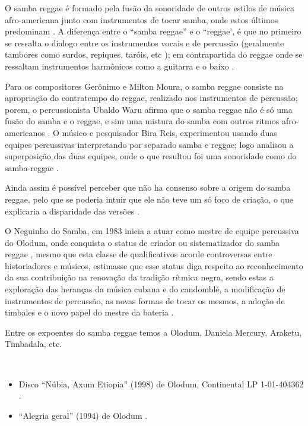 O samba reggae é formado pela fusão da sonoridade de outros estilos de música 
afro-americana junto com instrumentos de tocar samba, onde estos últimos predominam \cite[pp. 187]{casa1992anales} \cite[pp. 57]{guerreiro2000trama}.
A diferença entre o ``samba reggae'' e o ``reggae', 
é que no primeiro se ressalta o dialogo entre os instrumentos vocais e de percussão 
(geralmente tambores como surdos, repiques, taróis, etc \cite[pp. 178]{diniz2008almanaque});
em contrapartida do reggae onde se ressaltam instrumentos harmônicos como a guitarra e o baixo
\cite[pp. 57]{guerreiro2000trama}.

Para os compositores Gerônimo e Milton Moura, o samba reggae consiste na apropriação do contratempo do reggae,
realizado nos instrumentos de percussão;
porem, o percussionista Ubaldo Waru afirma que o samba reggae não é só uma fusão do samba e o reggae,
e sim uma mistura do samba com outros ritmos afro-americanos  \cite[pp. 57]{guerreiro2000trama}.
O músico e pesquisador Bira Reis, experimentou usando duas equipes percussivas 
interpretando por separado samba e reggae; 
logo analisou a superposição das duas equipes, onde o que resultou foi uma sonoridade como do samba-reggae \cite[pp. 57]{guerreiro2000trama}. 

Ainda assim é possível perceber que não ha consenso sobre a origem do samba reggae,
pelo que se poderia intuir que ele não teve um só foco de criação,
o que explicaria a disparidade das versões  \cite[pp. 58]{guerreiro2000trama}.

O  Neguinho do Samba, 
em 1983 inicia a atuar como mestre de equipe percussiva do Olodum, onde conquista o
status de criador ou sistematizador do samba reggae \cite[pp. 178]{diniz2008almanaque} \cite[pp. 58-60]{guerreiro2000trama}, 
mesmo que esta classe de qualificativos 
acorde controversas entre historiadores e músicos, estimasse que esse status
diga respeito ao reconhecimento da sua contribuição na renovação da tradição rítmica negra, sendo estas
a exploração das heranças da música cubana e do candomblé,
a modificação de instrumentos de percussão, as novas formas de tocar os mesmos,
a adoção de timbales e
o novo papel do mestre da bateria \cite[pp. 178]{diniz2008almanaque} \cite[pp. 58-60]{guerreiro2000trama}.

Entre os expoentes do samba reggae temos a Olodum, Daniela Mercury, Araketu, Timbadala,  etc.

\begin{example} ~

\begin{itemize}
\item Disco ``Núbia, Axum Etiopia'' (1998) de Olodum, Continental LP 1-01-404362 \cite[pp. 187]{casa1992anales}.
\item ``Alegria geral'' (1994) de Olodum \cite[pp. 207]{dunn2014brutality}.
\end{itemize}
\end{example}



